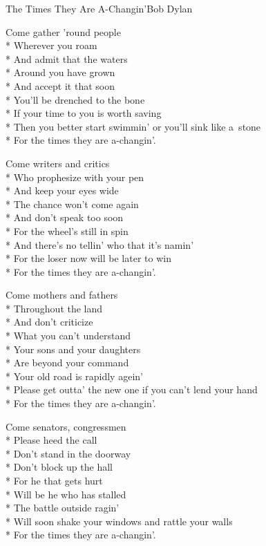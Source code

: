 \documentclass[10.5pt]{book}
\begin{document}
\fi
\begin{poem}{The Times They Are A-Changin'}{Bob Dylan}

\settowidth{\versewidth}{Please get outta' the new one if you can’t lend your hand}

Come gather 'round people\\*
Wherever you roam\\*
And admit that the waters\\*
Around you have grown\\*
And accept it that soon\\*
You’ll be drenched to the bone\\*
If your time to you is worth saving\\*
Then you better start swimmin' or you’ll sink like a~stone\\*
For the times they are a-changin'.

Come writers and critics\\*
Who prophesize with your pen\\*
And keep your eyes wide\\*
The chance won’t come again\\*
And don’t speak too soon\\*
For the wheel’s still in spin\\*
And there’s no tellin' who that it’s namin'\\*
For the loser now will be later to win\\*
For the times they are a-changin'.

\vfill\eject

Come mothers and fathers\\*
Throughout the land\\*
And don’t criticize\\*
What you can’t understand\\*
Your sons and your daughters\\*
Are beyond your command\\*
Your old road is rapidly agein'\\*
Please get outta' the new one if you can’t lend your hand\\*
For the times they are a-changin'.

Come senators, congressmen\\*
Please heed the call\\*
Don’t stand in the doorway\\*
Don’t block up the hall\\*
For he that gets hurt\\*
Will be he who has stalled\\*
The battle outside ragin'\\*
Will soon shake your windows and rattle your walls\\*
For the times they are a-changin'.


\end{poem}
\end{document}
